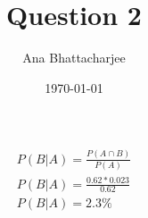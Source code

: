 \documentclass{article}
\begin{document}
\title{Question 2}
\author{Ana Bhattacharjee}
\date{\today}
\maketitle

\begin{center}
  \begin{align}
    P(B | A) = \frac{P(A \cap B)}{P(A)} \\
    P(B | A) = \frac{0.62 * 0.023}{0.62} \\
    P(B | A) = 2.3 \% 
  \end{align}
\end{center}
\end{document}
